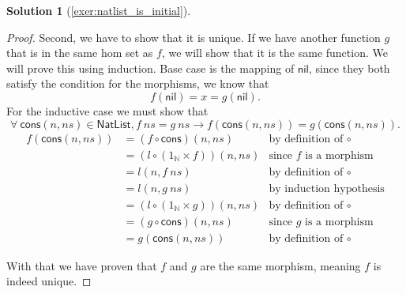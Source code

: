 \documentclass[a4paper,11pt, oneside,titlepage=false]{scrbook}
\theoremstyle{plain}
\theoremstyle{definition}
\newtheorem{solution}[thm]{Solution}
\newcommand{\nil}{\ensuremath{\mathsf{nil}}}
\newcommand{\cons}{\ensuremath{\mathsf{cons}}}
\newcommand{\NN}{\ensuremath{\mathbb{N}}}
\begin{document}
\begin{solution}[\cref{exer:natlist_is_initial}]
\begin{proof}
			Second, we have to show that it is unique.
			If we have another function $g$ that is in the same hom set as $f$, we will show that it is the same function.
			We will prove this using induction.
			Base case is the mapping of $\nil$, since they both satisfy the condition for the morphisms, we know that
			\[
				f ( \nil ) = x = g ( \nil ).
			\]
			For the inductive case we must show that
			\[
				\forall\ \cons (n, ns) \in \mathsf{NatList},
				f\ ns = g\ ns \to f (\cons (n, ns)) = g (\cons (n, ns)).
			\]
			\begin{align*}
				f (\cons (n, ns)) & = (f \circ \cons) (n, ns)           & \text{by definition of $\circ$} \\
				                          & = (l \circ (1_\NN \times f)) (n, ns) & \text{since $f$ is a morphism}  \\
				                          & = l (n, f\ ns)                              & \text{by definition of $\circ$} \\
				                          & = l (n, g\ ns)                              & \text{by induction hypothesis}  \\
				                          & = (l \circ (1_\NN \times g)) (n, ns)   & \text{by definition of $\circ$} \\
				                          & = (g \circ \cons) (n, ns)           & \text{since $g$ is a morphism}  \\
				                          & = g (\cons (n, ns))                 & \text{by definition of $\circ$}
			\end{align*}

      With that we have proven that $f$ and $g$ are the same morphism, meaning $f$ is indeed unique.
		\end{proof}
\end{solution}
\end{document}
